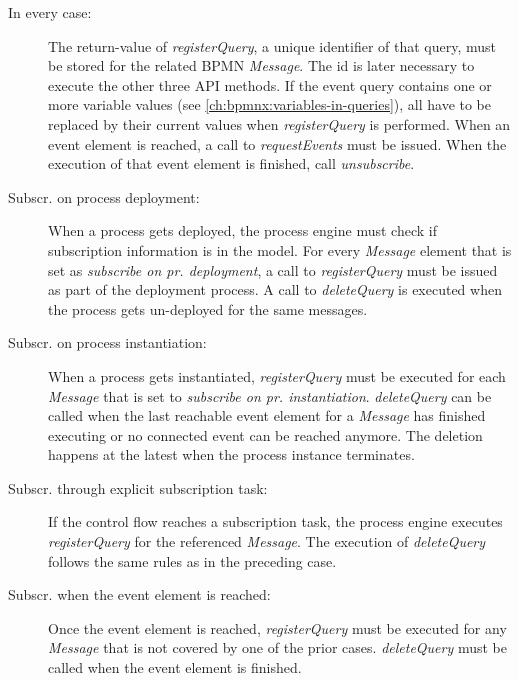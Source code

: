 \begin{description}
	\item[In every case:] 
		The return-value of \textit{registerQuery}, a unique identifier of that query, must be stored for the related BPMN \textit{Message}. The id is later necessary to execute the other three API methods.
		If the event query contains one or more variable values (see \autoref{ch:bpmnx:variables-in-queries}), all have to be replaced by their current values when \textit{registerQuery} is performed.
		When an event element is reached, a call to \textit{requestEvents} must be issued. When the execution of that event element is finished, call \textit{unsubscribe}.
	\item[Subscr. on process deployment:]
		When a process gets deployed, the process engine must check if subscription information is in the model. For every \textit{Message} element that is set as \textit{subscribe on pr. deployment}, a call to \textit{registerQuery} must be issued as part of the deployment process. A call to \textit{deleteQuery} is executed when the process gets un-deployed for the same messages.
	\item[Subscr. on process instantiation:] 
		When a process gets instantiated, \textit{registerQuery} must be executed for each \textit{Message} that is set to \textit{subscribe on pr. instantiation}. \textit{deleteQuery} can be called when the last reachable event element for a \textit{Message} has finished executing or no connected event can be reached anymore. The deletion happens at the latest when the process instance terminates.
	\item[Subscr. through explicit subscription task:]
		If the control flow reaches a subscription task, the process engine executes \textit{registerQuery} for the referenced \textit{Message}. The execution of \textit{deleteQuery} follows the same rules as in the preceding case.
	\item[Subscr. when the event element is reached:]
		Once the event element is reached, \textit{registerQuery} must be executed for any \textit{Message} that is not covered by one of the prior cases. \textit{deleteQuery} must be called when the event element is finished.
\end{description}



